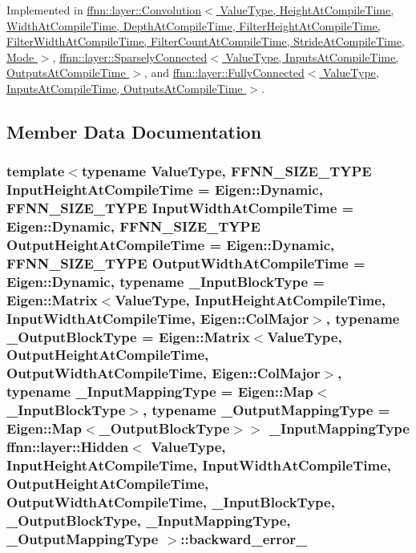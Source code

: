 Implemented in \hyperlink{classffnn_1_1layer_1_1_convolution_a398b063c5e953e0cb21a827f139a2540}{ffnn\-::layer\-::\-Convolution$<$ Value\-Type, Height\-At\-Compile\-Time, Width\-At\-Compile\-Time, Depth\-At\-Compile\-Time, Filter\-Height\-At\-Compile\-Time, Filter\-Width\-At\-Compile\-Time, Filter\-Count\-At\-Compile\-Time, Stride\-At\-Compile\-Time, Mode $>$}, \hyperlink{classffnn_1_1layer_1_1_sparsely_connected_afa564d528e74917231da2d038f76e3f1}{ffnn\-::layer\-::\-Sparsely\-Connected$<$ Value\-Type, Inputs\-At\-Compile\-Time, Outputs\-At\-Compile\-Time $>$}, and \hyperlink{classffnn_1_1layer_1_1_fully_connected_a3194dde96feea7d008cc0c27f30cc805}{ffnn\-::layer\-::\-Fully\-Connected$<$ Value\-Type, Inputs\-At\-Compile\-Time, Outputs\-At\-Compile\-Time $>$}.



\subsection{Member Data Documentation}
\hypertarget{classffnn_1_1layer_1_1_hidden_a4d615b2812b0c170e213a0b946d41e91}{
\subsubsection[{backward\-\_\-error\-\_\-}]{\setlength{\rightskip}{0pt plus 5cm}template$<$typename Value\-Type, F\-F\-N\-N\-\_\-\-S\-I\-Z\-E\-\_\-\-T\-Y\-P\-E Input\-Height\-At\-Compile\-Time = Eigen\-::\-Dynamic, F\-F\-N\-N\-\_\-\-S\-I\-Z\-E\-\_\-\-T\-Y\-P\-E Input\-Width\-At\-Compile\-Time = Eigen\-::\-Dynamic, F\-F\-N\-N\-\_\-\-S\-I\-Z\-E\-\_\-\-T\-Y\-P\-E Output\-Height\-At\-Compile\-Time = Eigen\-::\-Dynamic, F\-F\-N\-N\-\_\-\-S\-I\-Z\-E\-\_\-\-T\-Y\-P\-E Output\-Width\-At\-Compile\-Time = Eigen\-::\-Dynamic, typename \-\_\-\-Input\-Block\-Type = Eigen\-::\-Matrix$<$\-Value\-Type, Input\-Height\-At\-Compile\-Time, Input\-Width\-At\-Compile\-Time, Eigen\-::\-Col\-Major$>$, typename \-\_\-\-Output\-Block\-Type = Eigen\-::\-Matrix$<$\-Value\-Type, Output\-Height\-At\-Compile\-Time, Output\-Width\-At\-Compile\-Time, Eigen\-::\-Col\-Major$>$, typename \-\_\-\-Input\-Mapping\-Type = Eigen\-::\-Map$<$\-\_\-\-Input\-Block\-Type$>$, typename \-\_\-\-Output\-Mapping\-Type = Eigen\-::\-Map$<$\-\_\-\-Output\-Block\-Type$>$$>$ \-\_\-\-Input\-Mapping\-Type {\bf ffnn\-::layer\-::\-Hidden}$<$ Value\-Type, Input\-Height\-At\-Compile\-Time, Input\-Width\-At\-Compile\-Time, Output\-Height\-At\-Compile\-Time, Output\-Width\-At\-Compile\-Time, \-\_\-\-Input\-Block\-Type, \-\_\-\-Output\-Block\-Type, \-\_\-\-Input\-Mapping\-Type, \-\_\-\-Output\-Mapping\-Type $>$\-::backward\-\_\-error\-\_\-\hspace{0.3cm}{\ttfamily [protected]}}}\label{classffnn_1_1layer_1_1_hidden_a4d615b2812b0c170e213a0b946d41e91}


